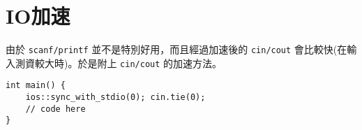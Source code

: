 \section{IO加速}
    由於 \verb|scanf/printf| 並不是特別好用，而且經過加速後的 \verb|cin/cout| 會比較快(在輸入測資較大時)。於是附上 \verb|cin/cout| 的加速方法。

    \begin{lstlisting}[caption=IO加速]
int main() {
    ios::sync_with_stdio(0); cin.tie(0);
    // code here
}\end{lstlisting}